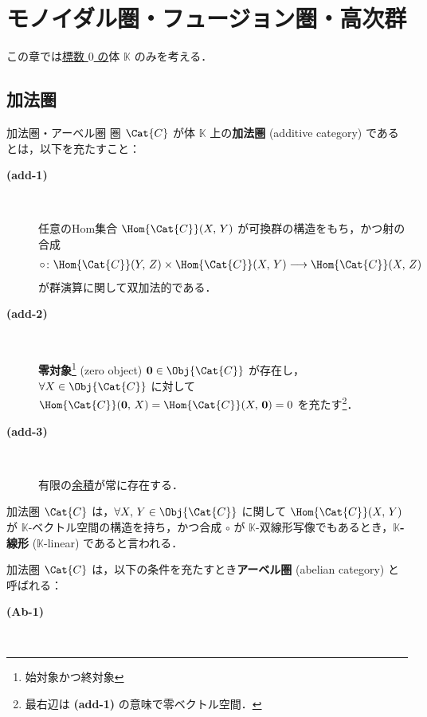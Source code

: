 \documentclass[TQFT_main]{subfiles}
\begin{document}
    \chapter{モノイダル圏・フュージョン圏・高次群}

    この章では\underline{標数 $0$ の}体 $\mathbb{K}$ のみを考える．

    \section{加法圏}

    \begin{mydef}[label=def:additive-cat,breakable]{加法圏・アーベル圏}
        圏 $\Cat{C}$ が体 $\mathbb{K}$ 上の\textbf{加法圏} (additive category) であるとは，以下を充たすこと：
        \begin{description}
            \item[\textbf{(add-1)}]　
            
            任意のHom集合 $\Hom{\Cat{C}}(X,\, Y)$ が可換群の構造をもち，かつ射の合成
            \begin{align}
                \circ \colon \Hom{\Cat{C}}(Y,\, Z) \times \Hom{\Cat{C}}(X,\, Y) \lto \Hom{\Cat{C}}(X,\, Z)
            \end{align}
            が群演算に関して双加法的である．

            \item[\textbf{(add-2)}]　
            
            \textbf{零対象}\footnote{始対象かつ終対象} (zero object) $\bm{0} \in \Obj{\Cat{C}}$ が存在し，$\forall X \in \Obj{\Cat{C}}$ に対して $\Hom{\Cat{C}}(\bm{0},\, X) = \Hom{\Cat{C}}(X,\, \bm{0}) = 0$ を充たす\footnote{最右辺は \textsf{\textbf{(add-1)}} の意味で零ベクトル空間．}．

            \item[\textbf{(add-3)}]　
            
            有限の\hyperref[def:product-coproduct]{余積}が常に存在する．
        \end{description}
        加法圏 $\Cat{C}$ は，$\forall X,\, Y \in \Obj{\Cat{C}}$ に関して $\Hom{\Cat{C}}(X,\, Y)$ が $\mathbb{K}$-ベクトル空間の構造を持ち，かつ合成 $\circ$ が $\mathbb{K}$-双線形写像でもあるとき，\textbf{$\mathbb{K}$-線形} ($\mathbb{K}$-linear) であると言われる．

        \tcblower

        加法圏 $\Cat{C}$ は，以下の条件を充たすとき\textbf{アーベル圏} (abelian category) と呼ばれる：
        \begin{description}
            \item[\textbf{(Ab-1)}]　
            

\end{description}
\end{mydef}
\end{document}
